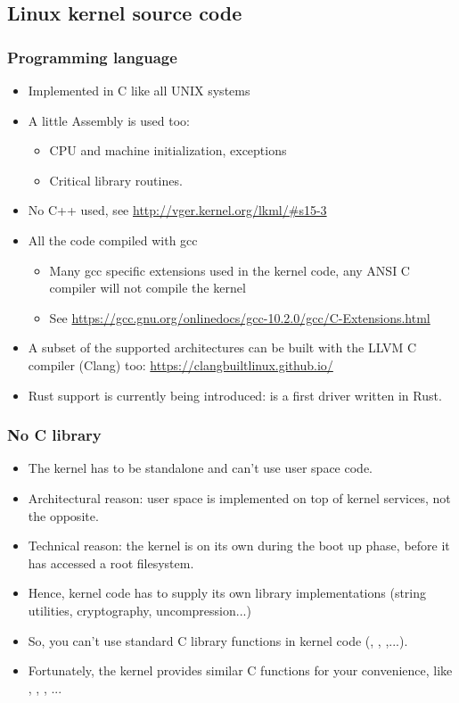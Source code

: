 \subsection{Linux kernel source code}

\begin{frame}
  \frametitle{Programming language}
  \begin{itemize}
  \item Implemented in C like all UNIX systems
  \item A little Assembly is used too:
    \begin{itemize}
    \item CPU and machine initialization, exceptions
    \item Critical library routines.
    \end{itemize}
  \item No C++ used, see \url{http://vger.kernel.org/lkml/\#s15-3}
  \item All the code compiled with gcc
    \begin{itemize}
    \item Many gcc specific extensions used in the kernel code, any
      ANSI C compiler will not compile the kernel
    \item See
      \url{https://gcc.gnu.org/onlinedocs/gcc-10.2.0/gcc/C-Extensions.html}
    \end{itemize}
    \item A subset of the supported architectures can be built with the
      LLVM C compiler (Clang) too: \url{https://clangbuiltlinux.github.io/}
    \item Rust support is currently being introduced:
       is a first driver written
      in Rust.
  \end{itemize}
\end{frame}


\begin{frame}
  \frametitle{No C library}
  \begin{itemize}
  \item The kernel has to be standalone and can't use user space code.
  \item Architectural reason: user space is implemented on top of kernel services, not the
    opposite.
  \item Technical reason: the kernel is on its own during the boot up
    phase, before it has accessed a root filesystem.
  \item Hence, kernel code has to supply its own library implementations
    (string utilities, cryptography, uncompression...)
  \item So, you can't use standard C library functions in kernel code
    (, , ,...).
  \item Fortunately, the kernel provides similar C functions for your
    convenience, like , ,
    , ...
  \end{itemize}
\end{frame}

